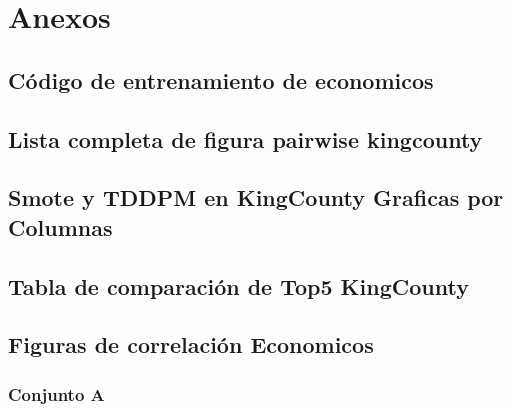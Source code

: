 \chapter{Anexos}

\section{Código de entrenamiento de economicos}



\section{Lista completa de figura pairwise kingcounty}
\label{A-pairwise}



\section{Smote y TDDPM en KingCounty Graficas por Columnas}

%

\section{Tabla de comparación de Top5 KingCounty}

\section{Figuras de correlación Economicos}

\subsection{Conjunto A}
%

